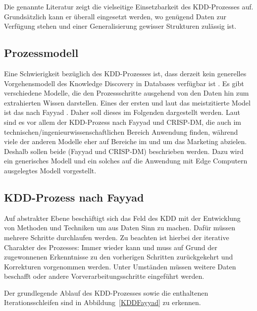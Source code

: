 Die genannte Literatur zeigt die vielseitige Einsetzbarkeit des KDD-Prozesses auf. Grundsätzlich kann er überall eingesetzt werden, wo genügend Daten zur Verfügung stehen und einer Generalisierung gewisser Strukturen zulässig ist. 


\subsection{Prozessmodell}

Eine Schwierigkeit bezüglich des KDD-Prozesses ist, dass \glqq derzeit kein generelles Vorgehensmodell des Knowledge Discovery in Databases verfügbar ist \grqq \cite{Dusing.2000}. Es gibt verschiedene Modelle, die den Prozessschritte ausgehend von den Daten hin zum extrahierten Wissen darstellen.  Eines der ersten und laut \cite{Kurgan:2006} das meistzitierte Model ist das nach  Fayyad \cite{Fayyad:1996}. Daher soll dieses im Folgenden dargestellt werden. Laut \cite{Kurgan:2006} sind es vor allem der KDD-Prozess nach Fayyad und CRISP-DM, die auch im  technischen/ingenieurwissenschaftlichen Bereich Anwendung finden, während viele der anderen Modelle eher auf Bereiche im und um das Marketing abzielen. Deshalb sollen beide (Fayyad und CRISP-DM) beschrieben werden.  Dazu wird ein generisches Modell und ein solches auf die Anwendung mit Edge Computern ausgelegtes Modell vorgestellt.

\subsection{KDD-Prozess nach Fayyad}
Auf abstrakter Ebene beschäftigt sich das Feld des KDD mit der Entwicklung von Methoden und Techniken um \glqq aus Daten Sinn zu machen\grqq \cite{Fayyad:1996}. Dafür müssen mehrere Schritte durchlaufen werden. Zu beachten ist hierbei der iterative Charakter des Prozesses: Immer wieder kann und muss auf Grund der zugewonnenen Erkenntnisse zu den vorherigen Schritten zurückgekehrt und Korrekturen vorgenommen werden. Unter Umständen müssen weitere Daten beschafft oder andere Vorverarbeitungsschritte eingeführt werden. \cite{Wrobel:1998}

Der grundlegende Ablauf des KDD-Prozesses sowie die enthaltenen Iterationsschleifen sind in Abbildung~\ref{KDDFayyad} zu erkennen.

